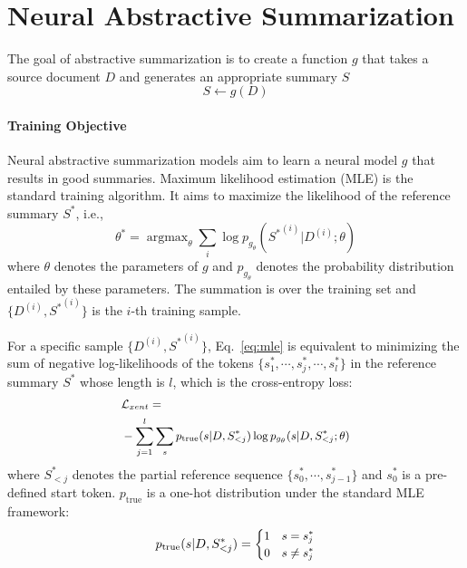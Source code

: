 \documentclass[11pt]{article}
\DeclareMathOperator*{\argmax}{argmax}
\begin{document}
\section{Neural Abstractive Summarization}

The goal of abstractive summarization is to create a function $g$ that takes a source document $D$ and generates an appropriate summary $S$
\begin{equation}
    S \leftarrow g(D)
\end{equation}

\paragraph{Training Objective}


Neural abstractive summarization models aim to learn a neural model $g$ that results in good summaries.
Maximum likelihood estimation (MLE) is the standard training algorithm. It aims to maximize the likelihood of the reference summary $S^*$, i.e.,
\begin{equation}
\label{eq:mle}
    \theta^* = \argmax_\theta \sum_i \log p_{g_\theta} ({S^*}^{(i)}|D^{(i)}; \theta)
\end{equation}
where $\theta$ denotes the parameters of $g$ and $p_{g_\theta}$ denotes the probability distribution entailed by these parameters. 
The summation is over the training set and $\{D^{(i)}, {S^*}^{(i)}\}$ is the $i$-th training sample.

For a specific sample $\{D^{(i)}, {S^*}^{(i)}\}$, Eq.~\ref{eq:mle} is equivalent to minimizing the sum of negative log-likelihoods of the tokens $\{s_1^*, \cdots , s_j^*, \cdots , s_l^*\}$ in the reference summary $S^*$ whose length is $l$, which is the cross-entropy loss:
\begin{equation}
\small
\begin{split}
    & \mathcal{L}_{xent} =  \\
    & - \sum_{j=1}^l \sum_s p_{\mathrm{true}} (s|D, S_{<j}^*) \log p_{g_\theta} (s |D, S_{<j}^*; \theta) \\
\end{split}
\label{eq:xent}
\end{equation}
where $S_{<j}^*$ denotes the partial reference sequence $\{s_0^*, \cdots, s_{j - 1}^*\}$ and $s_0^*$ is a pre-defined start token.
$p_{\mathrm{true}}$ is a one-hot distribution under the standard MLE framework:
\begin{equation}
    \small
    p_{\mathrm{true}} (s|D, S_{<j}^*) = 
    \begin{cases}
    1 & s = s_j^* \\
    0 & s \neq s_j^* \\
    \end{cases}
\label{eq:one-hot}
\end{equation}
\end{document}
